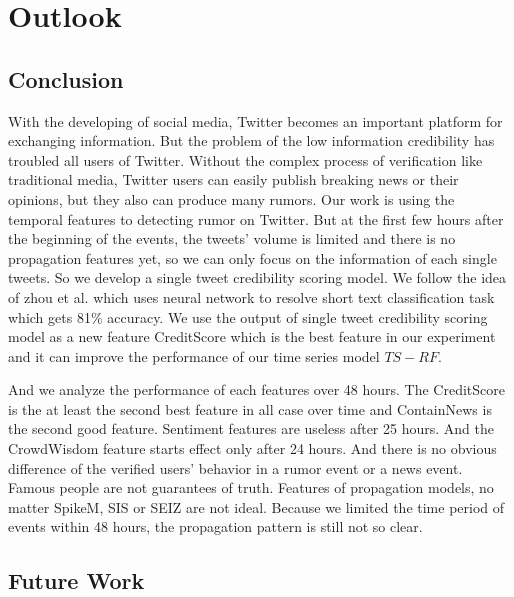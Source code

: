 \chapter{Outlook} %
\label{cha:conclusion_and_future_work}


\section{Conclusion}
\vspace{-2mm}
With the developing of social media, Twitter becomes an important platform for exchanging information. But the problem of the low information credibility has troubled all users of Twitter. Without the complex process of verification like traditional media, Twitter users can easily publish breaking news or their opinions, but they also can produce many rumors. Our work is using the temporal features to detecting rumor on Twitter. But at the first few hours after the beginning of the events, the tweets' volume is limited and there is no propagation features yet, so we can only focus on the information of each single tweets. So we develop a single tweet credibility scoring model. We follow the idea of zhou et al. which uses neural network to resolve short text classification task which gets 81\% accuracy. We use the output of single tweet credibility scoring model as a new feature CreditScore which is the best feature in our experiment and it can improve the performance of our time series model $TS-RF$. 

And we analyze the performance of each features over 48 hours. The CreditScore is the at least the second best feature in all case over time and ContainNews is the second good feature. Sentiment features are useless after 25 hours. And the CrowdWisdom feature starts effect only after 24 hours. And there is no obvious difference of the verified users' behavior in a rumor event or a news event. Famous people are not guarantees of truth. Features of propagation models, no matter SpikeM, SIS or SEIZ are not ideal. Because we limited the time period of events within 48 hours, the propagation pattern is still not so clear. 


\section{Future Work} %
\label{sec:future_work}

